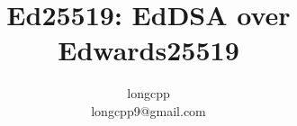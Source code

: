 \documentclass{article}
\begin{document}
\title{Ed25519: EdDSA over Edwards25519}
\author{longcpp \\ \small{longcpp9@gmail.com}}

\maketitle










\end{document}
